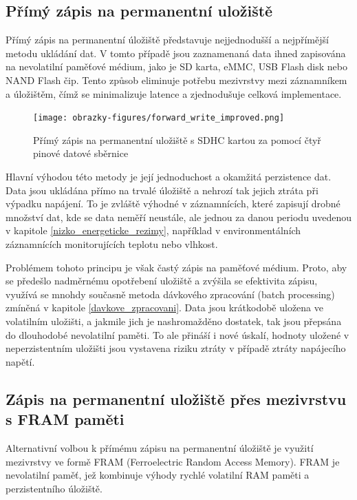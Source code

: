 \subsection{Přímý zápis na permanentní uložiště}
Přímý zápis na permanentní úložiště představuje nejjednodušší a nejpřímější metodu ukládání dat. V tomto případě jsou zaznamenaná data ihned zapisována na nevolatilní paměťové médium, jako je SD karta, eMMC, USB Flash disk nebo NAND Flash čip. Tento způsob eliminuje potřebu mezivrstvy mezi záznamníkem a úložištěm, čímž se minimalizuje latence a zjednodušuje celková implementace.

\begin{figure}[h]
    \centering
    \texttt{[image: obrazky-figures/forward\_write\_improved.png]}
    
    \caption{Přímý zápis na permanentní uložiště s SDHC kartou za pomocí čtyř pinové datové sběrnice}
    \label{fig:forward-write}
\end{figure}

Hlavní výhodou této metody je její jednoduchost a okamžitá perzistence dat. Data jsou ukládána přímo na trvalé úložiště a nehrozí tak jejich ztráta při výpadku napájení. To je zvláště výhodné v záznamnících, které zapisují drobné množství dat, kde se data neměří neustále, ale jednou za danou periodu uvedenou v kapitole \ref{nizko_energeticke_rezimy}, například v environmentálních záznamnících monitorujících teplotu nebo vlhkost.

Problémem tohoto principu je však častý zápis na paměťové médium. Proto, aby se předešlo nadměrnému opotřebení uložiště a zvýšila se efektivita zápisu, využívá se mnohdy současně metoda dávkového zpracování (batch processing) zmíněná v kapitole \ref{davkove_zpracovani}. Data jsou krátkodobě uložena ve volatilním uložišti, a jakmile jich je nashromažděno dostatek, tak jsou přepsána do dlouhodobé nevolatilní paměti. To ale přináší i nové úskalí, hodnoty uložené v neperzistentním uložišti jsou vystavena riziku ztráty v případě ztráty napájecího napětí.

\subsection{Zápis na permanentní uložiště přes mezivrstvu s FRAM paměti}
Alternativní volbou k přímému zápisu na permanentní úložiště je využití mezivrstvy ve formě FRAM (Ferroelectric Random Access Memory). FRAM je nevolatilní paměť, jež kombinuje výhody rychlé volatilní RAM paměti a perzistentního úložiště.

